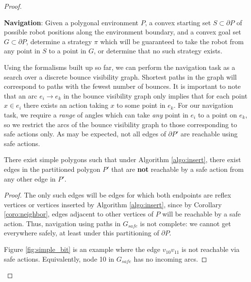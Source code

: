 \documentclass[]{styles/svproc}  %
\begin{document}
\begin{proof}
\begin{definition}
\textbf{Navigation}:
Given a polygonal environment $P$, a convex starting set $S \subset \partial P$ of possible robot positions along the
environment boundary, and a convex goal set $G \subset \partial P$, determine a strategy $\pi$ which
will be guaranteed to take the robot from any point in $S$ to a point in $G$, or
determine that no such strategy exists.
\end{definition}

Using the formalisms built up so far, we can perform the navigation task as a
search over a discrete bounce visibility graph. Shortest paths in the graph 
will correspond to paths with the fewest number of bounces. It is important to
note that an arc $e_i \to e_k$ in the bounce visibility graph only implies that for each
point $x \in e_i$ there exists an action taking $x$ to some point in $e_k$. For
our navigation task, we require a {\em range} of angles which can take {\em any}
point in $e_i$ to a point on $e_k$, so we restrict the arcs of the bounce
visibility graph to those corresponding to safe actions only. As may be
expected, not all edges of $\partial P'$ are reachable using safe actions.

\begin{proposition}
There exist simple polygons such that under Algorithm \ref{algo:insert}, there
exist edges in the partitioned polygon $P'$ that are \textbf{not} reachable by 
a safe action from any other edge in $P'$.
\end{proposition}

\begin{proof}
The only such edges will be
edges for which both endpoints are reflex vertices or vertices inserted by Algorithm
\ref{algo:insert}, since by Corollary \ref{coro:neighbor},
edges adjacent to other vertices of $P$ will be reachable by a safe
action. Thus, navigation using paths in $G_{safe}$ is not complete: we cannot
get everywhere safely, at least under this partitioning of $\partial P$.

Figure \ref{fig:simple_bit} is an example where the edge
$v_{10} v_{11}$ is not reachable via safe actions. Equivalently,
node 10 in $G_{safe}$ has no incoming arcs.
\end{proof}


\end{proof}
\end{document}
